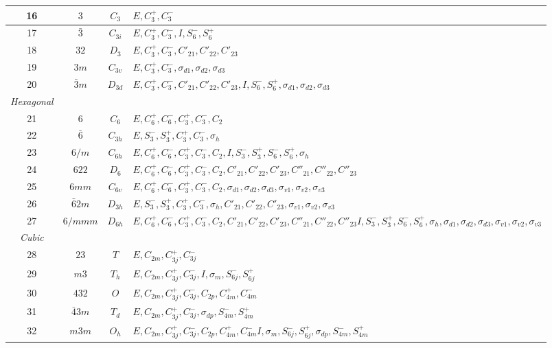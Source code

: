 \documentclass[11pt,a4paper,twoside,openright]{book}
\begin{document}
\begin{minipage}{\textwidth}
\begin{tabular}{|c|c|c|p{}|}
16 & $3$ & $C_{3}$ & $E, C_{3}^{+}, C_{3}^{-}$ \\ \hline
17 & $\bar{3}$ & $C_{3i}$ & $E, C_{3}^{+}, C_{3}^{-}, I, S_{6}^{-}, S_{6}^{+}$ \\ \hline
18 & $32$ & $D_{3}$ & $E, C_{3}^{+}, C_{3}^{-}, C'_{21}, C'_{22}, C'_{23}$ \\ \hline
19 & $3m$ & $C_{3v}$ & $E, C_{3}^{+}, C_{3}^{-}, \sigma_{d1}, \sigma_{d2}, \sigma_{d3}$ \\ \hline
20 & $\bar{3}m$ & $D_{3d}$ & $E, C_{3}^{+}, C_{3}^{-}, C'_{21}, C'_{22}, C'_{23}, I, S_{6}^{-}, S_{6}^{+}, \sigma_{d1}, \sigma_{d2}, \sigma_{d3}$ \\ \hline
\textit{Hexagonal} &  &  &  \\ \hline
21 & $6$ & $C_{6}$ & $E, C_{6}^{+}, C_{6}^{-}, C_{3}^{+}, C_{3}^{-}, C_{2}$ \\ \hline
22 & $\bar{6}$ & $C_{3h}$ & $E, S_{3}^{-}, S_{3}^{+}, C_{3}^{+}, C_{3}^{-}, \sigma_{h}$ \\ \hline
23 & $6/m$ & $C_{6h}$ & $E, C_{6}^{+}, C_{6}^{-}, C_{3}^{+}, C_{3}^{-}, C_{2}, I, S_{3}^{-}, S_{3}^{+}, S_{6}^{-}, S_{6}^{+}, \sigma_{h}$ \\ \hline
24 & $622$ & $D_{6}$ & $E, C_{6}^{+}, C_{6}^{-}, C_{3}^{+}, C_{3}^{-}, C_{2}, C'_{21}, C'_{22}, C'_{23}, C''_{21}, C''_{22}, C''_{23}$ \\ \hline
25 & $6mm$ & $C_{6v}$ & $E, C_{6}^{+}, C_{6}^{-}, C_{3}^{+}, C_{3}^{-}, C_{2}, \sigma_{d1}, \sigma_{d2}, \sigma_{d3}, \sigma_{v1}, \sigma_{v2}, \sigma_{v3}$ \\ \hline
26 & $\bar{6}2m$ & $D_{3h}$ & $E, S_{3}^{-}, S_{3}^{+}, C_{3}^{+}, C_{3}^{-}, \sigma_{h}, C'_{21}, C'_{22}, C'_{23}, \sigma_{v1}, \sigma_{v2}, \sigma_{v3}$ \\ \hline
27 & $6/mmm$ & $D_{6h}$ & $E, C_{6}^{+}, C_{6}^{-}, C_{3}^{+}, C_{3}^{-}, C_{2}, C'_{21}, C'_{22}, C'_{23}, C''_{21}, C''_{22}, C''_{23}$\newline $I, S_{3}^{-}, S_{3}^{+}, S_{6}^{-}, S_{6}^{+}, \sigma_{h}, \sigma_{d1}, \sigma_{d2}, \sigma_{d3}, \sigma_{v1}, \sigma_{v2}, \sigma_{v3}$ \\ \hline
\textit{Cubic} &  &  &  \\ \hline
28 & $23$ & $T$ & $E, C_{2m}, C_{3j}^{+}, C_{3j}^{-}$ \\ \hline
29 & $m3$ & $T_{h}$ & $E, C_{2m}, C_{3j}^{+}, C_{3j}^{-}, I, \sigma_{m}, S_{6j}^{-}, S_{6j}^{+}$ \\ \hline
30 & $432$ & $O$ & $E, C_{2m}, C_{3j}^{+}, C_{3j}^{-}, C_{2p}, C_{4m}^{+}, C_{4m}^{-}$ \\ \hline
31 & $\bar{4}3m$ & $T_{d}$ & $E, C_{2m}, C_{3j}^{+}, C_{3j}^{-}, \sigma_{dp}, S_{4m}^{-}, S_{4m}^{+}$ \\ \hline
32 & $m3m$ & $O_{h}$ & $E, C_{2m}, C_{3j}^{+}, C_{3j}^{-}, C_{2p}, C_{4m}^{+}, C_{4m}^{-}$\newline $I, \sigma_{m}, S_{6j}^{-}, S_{6j}^{+}, \sigma_{dp}, S_{4m}^{-}, S_{4m}^{+}$ \\ \hline
\end{tabular}
\end{minipage}
\medskip
\end{document}
